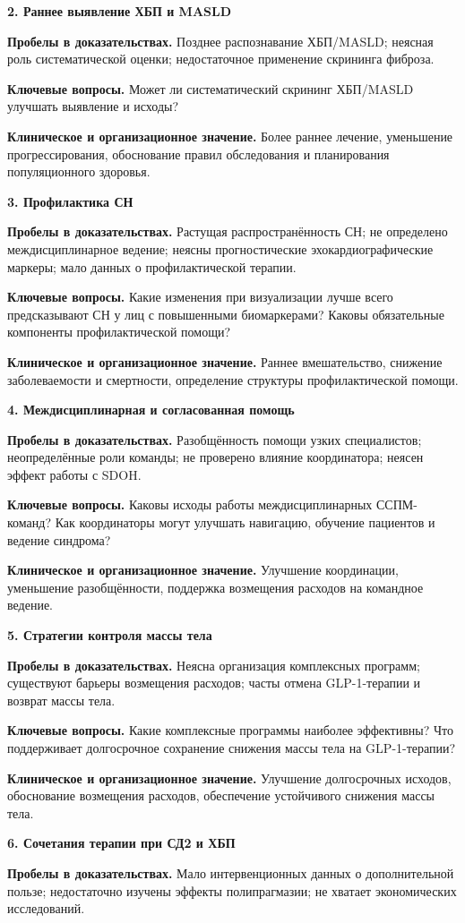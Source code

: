 \documentclass[11pt,a4paper]{article}
\newcommand{\heading}[1]{\par\medskip\textbf{#1}\par}
\begin{document}
\heading{2. Раннее выявление ХБП и MASLD}
\textbf{Пробелы в доказательствах.} Позднее распознавание ХБП/MASLD; неясная роль систематической оценки; недостаточное применение скрининга фиброза.

\textbf{Ключевые вопросы.} Может ли систематический скрининг ХБП/MASLD улучшать выявление и исходы?

\textbf{Клиническое и организационное значение.} Более раннее лечение, уменьшение прогрессирования, обоснование правил обследования и планирования популяционного здоровья.

\heading{3. Профилактика СН}
\textbf{Пробелы в доказательствах.} Растущая распространённость СН; не определено междисциплинарное ведение; неясны прогностические эхокардиографические маркеры; мало данных о профилактической терапии.

\textbf{Ключевые вопросы.} Какие изменения при визуализации лучше всего предсказывают СН у лиц с повышенными биомаркерами? Каковы обязательные компоненты профилактической помощи?

\textbf{Клиническое и организационное значение.} Раннее вмешательство, снижение заболеваемости и смертности, определение структуры профилактической помощи.

\heading{4. Междисциплинарная и согласованная помощь}
\textbf{Пробелы в доказательствах.} Разобщённость помощи узких специалистов; неопределённые роли команды; не проверено влияние координатора; неясен эффект работы с SDOH.

\textbf{Ключевые вопросы.} Каковы исходы работы междисциплинарных ССПМ-команд? Как координаторы могут улучшать навигацию, обучение пациентов и ведение синдрома?

\textbf{Клиническое и организационное значение.} Улучшение координации, уменьшение разобщённости, поддержка возмещения расходов на командное ведение.

\heading{5. Стратегии контроля массы тела}
\textbf{Пробелы в доказательствах.} Неясна организация комплексных программ; существуют барьеры возмещения расходов; часты отмена GLP-1-терапии и возврат массы тела.

\textbf{Ключевые вопросы.} Какие комплексные программы наиболее эффективны? Что поддерживает долгосрочное сохранение снижения массы тела на GLP-1-терапии?

\textbf{Клиническое и организационное значение.} Улучшение долгосрочных исходов, обоснование возмещения расходов, обеспечение устойчивого снижения массы тела.

\heading{6. Сочетания терапии при СД2 и ХБП}
\textbf{Пробелы в доказательствах.} Мало интервенционных данных о дополнительной пользе; недостаточно изучены эффекты полипрагмазии; не хватает экономических исследований.
\end{document}
